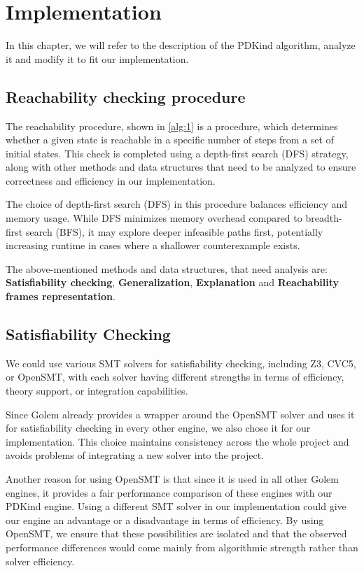 \chapter{Implementation}
\noindent In this chapter, we will refer to the description of the PDKind algorithm, analyze it and modify it to fit our implementation.

\section{Reachability checking procedure}
The reachability procedure, shown in \ref{alg:1} is a procedure, which determines whether a given state is reachable in a specific number of steps from a set of initial states. This check is completed using a depth-first search (DFS) strategy, along with other methods and data structures that need to be analyzed to ensure correctness and efficiency in our implementation.

The choice of depth-first search (DFS) in this procedure balances efficiency and memory usage. While DFS minimizes memory overhead compared to breadth-first search (BFS), it may explore deeper infeasible paths first, potentially increasing runtime in cases where a shallower counterexample exists.

The above-mentioned methods and data structures, that need analysis are: \textbf{Satisfiability checking}, \textbf{Generalization}, \textbf{Explanation} and \textbf{Reachability frames representation}.
\section*{Satisfiability Checking}
\noindent We could use various SMT solvers for satisfiability checking, including Z3\cite{10.1007/978-3-540-78800-3_24}, CVC5\cite{10.1007/978-3-030-99524-9_24}, or OpenSMT\cite{10.1007/978-3-642-12002-2_12}, with each solver having different strengths in terms of efficiency, theory support, or integration capabilities.

Since Golem already provides a wrapper around the OpenSMT solver and uses it for satisfiability checking in every other engine, we also chose it for our implementation. This choice maintains consistency across the whole project and avoids problems of integrating a new solver into the project.

Another reason for using OpenSMT is that since it is used in all other Golem engines, it provides a fair performance comparison of these engines with our PDKind engine. Using a different SMT solver in our implementation could give our engine an advantage or a disadvantage in terms of efficiency. By using OpenSMT, we ensure that these possibilities are isolated and that the observed performance differences would come mainly from algorithmic strength rather than solver efficiency.

